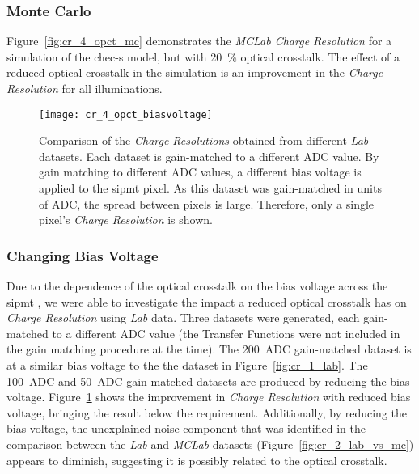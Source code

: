 \subsubsection{Monte Carlo}

Figure~\ref{fig:cr_4_opct_mc} demonstrates the \textit{MCLab Charge Resolution} for a simulation of the \gls{chec-s} model, but with \SI{20}{\percent} optical crosstalk. The effect of a reduced optical crosstalk in the simulation is an improvement in the \textit{Charge Resolution} for all illuminations.

\begin{figure}[H]
	\centering
    \texttt{[image: cr\_4\_opct\_biasvoltage]} 
	\caption[Comparison of the \textit{Lab Charge Resolution} with different bias voltages applied to the SiPM pixel.]{Comparison of the \textit{Charge Resolutions} obtained from different \textit{Lab} datasets. Each dataset is gain-matched to a different ADC value. By gain matching to different ADC values, a different bias voltage is applied to the \gls{sipmt} pixel. As this dataset was gain-matched in units of ADC, the spread between pixels is large. Therefore, only a single pixel's \textit{Charge Resolution} is shown.}
	\label{fig:cr_4_opct_biasvoltage}
\end{figure}

\subsubsection{Changing Bias Voltage}

Due to the dependence of the optical crosstalk on the bias voltage across the \gls{sipmt} , we were able to investigate the impact a reduced optical crosstalk has on \textit{Charge Resolution} using \textit{Lab} data. Three datasets were generated, each gain-matched to a different ADC value (the Transfer Functions were not included in the gain matching procedure at the time). The \SI{200}{ADC} gain-matched dataset is at a similar bias voltage to the the dataset in Figure~\ref{fig:cr_1_lab}. The \SI{100}{ADC} and \SI{50}{ADC} gain-matched datasets are produced by reducing the bias voltage. Figure~\ref{fig:cr_4_opct_biasvoltage} shows the improvement in \textit{Charge Resolution} with reduced bias voltage, bringing the result below the requirement. Additionally, by reducing the bias voltage, the unexplained noise component that was identified in the comparison between the \textit{Lab} and \textit{MCLab} datasets (Figure~\ref{fig:cr_2_lab_vs_mc}) appears to diminish, suggesting it is possibly related to the optical crosstalk.

